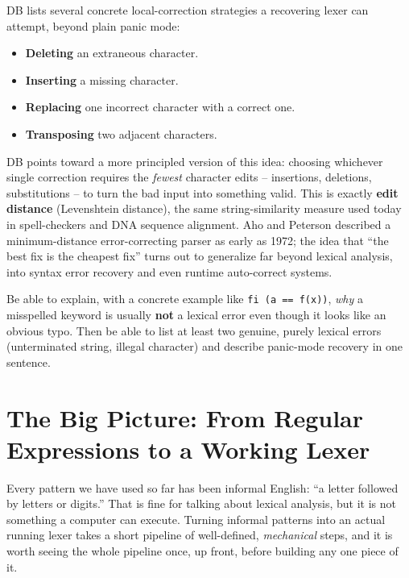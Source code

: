 \documentclass[full-course-notes.tex]{subfiles}
\begin{document}
\dbtag DB lists several concrete local-correction strategies a recovering lexer can attempt,
beyond plain panic mode:

\begin{itemize}
  \item \textbf{Deleting} an extraneous character.
  \item \textbf{Inserting} a missing character.
  \item \textbf{Replacing} one incorrect character with a correct one.
  \item \textbf{Transposing} two adjacent characters.
\end{itemize}

\begin{historynote}
DB points toward a more principled version of this idea: choosing whichever single correction
requires the \emph{fewest} character edits -- insertions, deletions, substitutions -- to turn
the bad input into something valid. This is exactly \textbf{edit distance} (Levenshtein
distance), the same string-similarity measure used today in spell-checkers and DNA sequence
alignment. Aho and Peterson described a minimum-distance error-correcting parser as early as
1972; the idea that ``the best fix is the cheapest fix'' turns out to generalize far beyond
lexical analysis, into syntax error recovery and even runtime auto-correct systems.
\end{historynote}

\begin{examfocus}
Be able to explain, with a concrete example like \texttt{fi (a == f(x))}, \emph{why} a
misspelled keyword is usually \textbf{not} a lexical error even though it looks like an obvious
typo. Then be able to list at least two genuine, purely lexical errors (unterminated string,
illegal character) and describe panic-mode recovery in one sentence.
\end{examfocus}

\section{The Big Picture: From Regular Expressions to a Working Lexer}
\label{sec:l3-big-picture}

\dbtag Every pattern we have used so far has been informal English: ``a letter followed by
letters or digits.'' That is fine for talking about lexical analysis, but it is not something a
computer can execute. Turning informal patterns into an actual running lexer takes a short
pipeline of well-defined, \emph{mechanical} steps, and it is worth seeing the whole pipeline
once, up front, before building any one piece of it.
\end{document}
